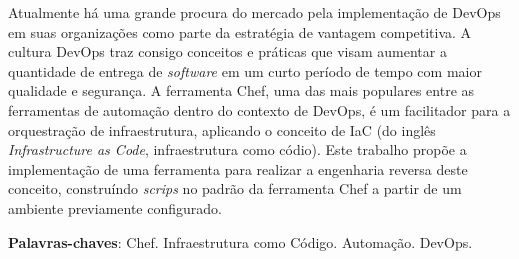 \newpage\null\thispagestyle{empty}\newpage
\begin{resumo}
  Atualmente há uma grande procura do mercado pela implementação de
  DevOps em suas organizações como parte da estratégia de vantagem
  competitiva. A cultura DevOps traz consigo conceitos e práticas
  que visam aumentar a quantidade de entrega de \textit{software} em um
  curto período de tempo com maior qualidade e segurança. A
  ferramenta Chef, uma das mais populares entre as ferramentas de
  automação dentro do contexto de DevOps, é um facilitador para
  a orquestração de infraestrutura, aplicando o conceito de
  IaC (do inglês \textit{Infrastructure as Code}, infraestrutura como códio). 
  Este trabalho propõe a implementação de uma ferramenta para realizar a 
  engenharia reversa deste conceito, construíndo \textit{scrips} no padrão da 
  ferramenta Chef a partir de um ambiente previamente configurado.

  \vspace{\onelineskip}
  \noindent
   \textbf{Palavras-chaves}: Chef. Infraestrutura como Código. Automação. DevOps.
\end{resumo}
